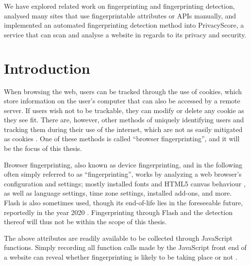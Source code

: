 \documentclass[
    fontsize=12pt,
    headings=small,
    parskip=half,
    bibliography=totoc,
    numbers=noenddot,
    open=any
    ]{scrreprt}
\begin{document}
We have explored related work on fingerprinting and fingerprinting detection,
analysed many sites that use fingerprintable attributes or APIs manually,
and implemented an automated fingerprinting detection method into PrivacyScore,
a service that can scan and analyse a website in regards to its privacy and security.

\setcounter{tocdepth}{1}
\tableofcontents

\chapter{Introduction}
\label{chap:introduction}

When browsing the web, users can be tracked through the use of cookies, which store information on the user's computer
that can also be accessed by a remote server.
If users wish not to be trackable, they can modify or delete any cookie as they see fit.
There are, however, other methods of uniquely identifying users and tracking them during their use of the internet,
which are not as easily mitigated as cookies \cite{am_i_unique}. One of these methods is called ``browser fingerprinting'',
and it will be the focus of this thesis.

Browser fingerprinting, also known as device fingerprinting, and in the following often simply referred to as ``fingerprinting'',
works by analyzing a web browser's configuration and settings; mostly installed fonts and HTML5 canvas behaviour
\cite{DBLP:conf/ccs/EnglehardtN16}, as well as
language settings, time zone settings, installed add-ons, and more. Flash is also sometimes used, though
its end-of-life lies in the foreseeable future, reportedly in the year
2020 \cite{flash_eol}.
Fingerprinting through Flash and the detection thereof will thus not be within the scope of this thesis.

The above attributes are readily available to be collected through JavaScript functions. Simply recording
all function calls made by the JavaScript front end of a website can reveal whether fingerprinting is likely to
be taking place or not \cite{faiz2014browser, panopticlick}.
\end{document}
